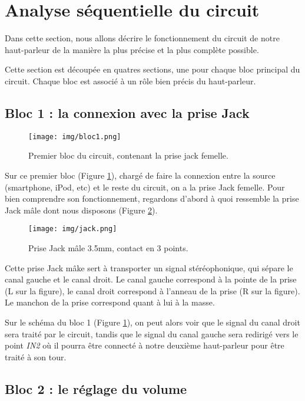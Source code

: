\documentclass{article}
\begin{document}
\section{Analyse séquentielle du circuit}
Dans cette section, nous allons décrire le fonctionnement du circuit
de notre haut-parleur de la manière la plus précise et la plus complète
possible. 

Cette section est découpée en quatres sections, une pour chaque bloc 
principal du circuit. Chaque bloc est associé à un rôle bien précis du
haut-parleur.

\subsection{Bloc 1 : la connexion avec la prise Jack}

\begin{figure}[h]
	\centering
	\texttt{[image: img/bloc1.png]}
	\caption{Premier bloc du circuit, contenant 
					la prise jack femelle.}
	\label{bloc1}
\end{figure}

Sur ce premier bloc (Figure \ref{bloc1}), chargé de faire la connexion entre la source (smartphone, iPod, etc) et le reste du circuit, on a la prise Jack femelle. Pour bien comprendre son fonctionnement, regardons d'abord à quoi ressemble la prise Jack mâle dont nous disposons (Figure \ref{jack}).

\begin{figure}[h]
	\centering
	\texttt{[image: img/jack.png]}
	\caption{Prise Jack mâle 3.5mm, contact en 3 points.}
	\label{jack}
\end{figure}

Cette prise Jack mâke sert à transporter un signal stéréophonique, qui sépare le canal gauche et le canal droit.
Le canal gauche correspond à la pointe de la prise (L sur la figure), le canal droit correspond à l'anneau de la prise (R sur la figure). Le manchon de la prise correspond quant à lui à la masse.

Sur le schéma du bloc 1 (Figure \ref{bloc1}), on peut alors voir que le signal du canal droit sera traité par le circuit, tandis que le signal du canal gauche sera redirigé vers le point \textit{IN2} où il pourra être connecté à notre deuxième haut-parleur pour être traité à son tour.

\subsection{Bloc 2 : le réglage du volume}
\end{document}
